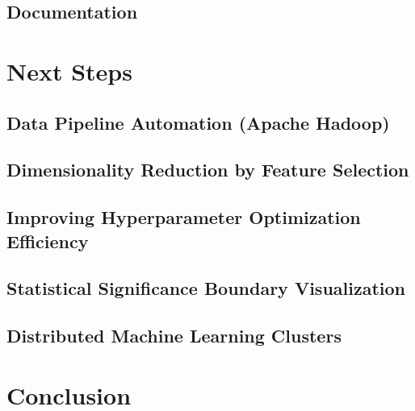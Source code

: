 \documentclass[11pt, oneside]{article}
\begin{document}
\subsection{Documentation}

\section{Next Steps}
\subsection{Data Pipeline Automation (Apache Hadoop)}
\subsection{Dimensionality Reduction by Feature Selection}
\subsection{Improving Hyperparameter Optimization Efficiency}
\subsection{Statistical Significance Boundary Visualization}
\subsection{Distributed Machine Learning Clusters}

\section{Conclusion}
\end{document}
